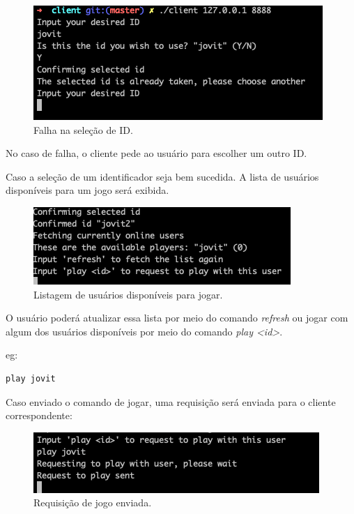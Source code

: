 \documentclass[12pt,a4paper]{report}
\begin{document}
\begin{figure}[H]
    \includegraphics[width=\linewidth]{input_id_fail.png}
    \caption{Falha na seleção de ID.}
\end{figure}

No caso de falha, o cliente pede ao usuário para escolher um outro ID.

\bigbreak

Caso a seleção de um identificador seja bem sucedida. A lista de usuários disponíveis para um jogo será exibida.
\begin{figure}[H]
    \includegraphics[width=\linewidth]{user_list.png}
    \caption{Listagem de usuários disponíveis para jogar.}
\end{figure}

O usuário poderá atualizar essa lista por meio do comando \emph{refresh} ou jogar com algum dos usuários disponíveis por meio do comando \emph{play <id>}. 

eg:
\begin{lstlisting}[language=bash]
    play jovit
\end{lstlisting}

\bigbreak

Caso enviado o comando de jogar, uma requisição será enviada para o cliente correspondente:

\begin{figure}[H]
    \includegraphics[width=\linewidth]{request_sent.png}
    \caption{Requisição de jogo enviada.}
\end{figure}
\end{document}
